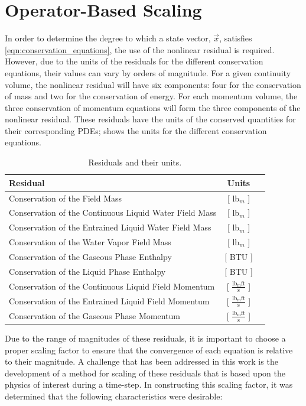 \section{Operator-Based Scaling}
\label{sect:operator_scaling}
In order to determine the degree to which a state vector, $\vec{x}$, satisfies \eqref{eqn:conservation_equations}, the use of the nonlinear residual is required.
However, due to the units of the residuals for the different conservation equations, their values can vary by orders of magnitude. 
For a given continuity volume, the nonlinear residual will have six components: four for the conservation of mass and two for the conservation of energy.
For each momentum volume, the three conservation of momentum equations will form the three components of the nonlinear residual.
These residuals have the units of the conserved quantities for their corresponding PDEs;  shows the units for the different conservation equations.

\begin{table}[ht]
\centering
\begin{tabular}{@{}l c r @{}} \toprule
Residual & Units \\
\midrule
Conservation of the \NCG{} Field Mass                  & [ lb$_m$ ] \\
Conservation of the Continuous Liquid Water Field Mass & [ lb$_m$ ] \\
Conservation of the Entrained Liquid Water Field Mass  & [ lb$_m$ ] \\
Conservation of the Water Vapor Field Mass             & [ lb$_m$ ] \\
Conservation of the Gaseous Phase Enthalpy             & [ BTU ]    \\
Conservation of the Liquid Phase Enthalpy              & [ BTU ]    \\
Conservation of the Continuous Liquid Field Momentum   & [ $\frac{\text{lb}_{\text{m}} \text{ft}}{\text{s}}$ ] \\
Conservation of the Entrained Liquid Field Momentum & [ $\frac{\text{lb}_{\text{m}} \text{ft}}{\text{s}}$ ] \\
Conservation of the Gaseous Phase Momentum & [ $\frac{\text{lb}_{\text{m}} \text{ft}}{\text{s}}$ ] \\
\bottomrule  
\end{tabular}
\caption{Residuals and their units.}
\label{tab:scaling_units_scales}
\end{table}

Due to the range of magnitudes of these residuals, it is important to choose a proper scaling factor to ensure that the convergence of each equation is relative to their magnitude.
A challenge that has been addressed in this work is the development of a method for scaling of these residuals that is based upon the physics of interest during a time-step.
In constructing this scaling factor, it was determined that the following characteristics were desirable:

